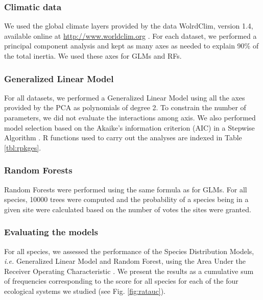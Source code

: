 \subsubsection{Climatic data}\label{climatic-data}

We used the global climate layers provided by the data WolrdClim,
version 1.4, available online at \url{http://www.worldclim.org}
\citep{Hijmans2005}. For each dataset, we performed a principal
component analysis and kept as many axes as needed to explain 90\% of
the total inertia. We used these axes for GLMs and RFs.

\subsubsection{Generalized Linear Model}\label{generalized-linear-model}

For all datasets, we performed a Generalized Linear Model
\citep{Elith2006} using all the axes provided by the PCA as polynomials
of degree 2. To constrain the number of parameters, we did not evaluate
the interactions among axis. We also performed model selection based on
the Akaike's information criterion (AIC) in a Stepwise Algorithm
\citep{burnham2013model}. R functions used to carry out the analyses are
indexed in Table \ref{tbl:rpkges}.

\subsubsection{Random Forests}\label{random-forests}

Random Forests \citep{Prasad2006} were performed using the same formula
as for GLMs. For all species, 10000 trees were computed and the
probability of a species being in a given site were calculated based on
the number of votes the sites were granted.

\subsubsection{Evaluating the models}\label{evaluating-the-models}

For all species, we assessed the performance of the Species Distribution
Models, \emph{i.e.} Generalized Linear Model and Random Forest, using
the Area Under the Receiver Operating Characteristic
\citep[AUROC,][]{Elith2006}. We present the results as a cumulative sum
of frequencies corresponding to the score for all species for each of
the four ecological systems we studied (see Fig. \ref{fig:ratauc}).


